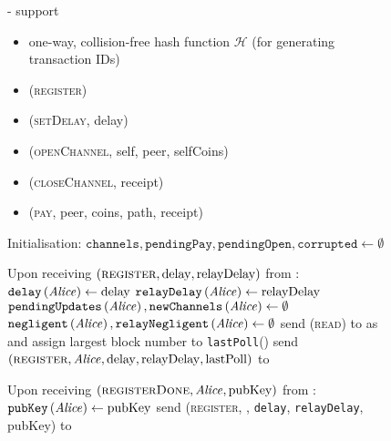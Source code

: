 \begin{figure}[H]
  \begin{systembox}{\fpaynet - support}
      \begin{itemize}
        \item one-way, collision-free hash function $\mathcal{H}$ (for
        generating transaction IDs)
      \end{itemize}

      \begin{itemize}
        \item (\textsc{register})
        \item (\textsc{setDelay}, delay)
        \item (\textsc{openChannel}, self, peer, selfCoins)
        \item (\textsc{closeChannel}, receipt)
        \item (\textsc{pay}, peer, coins, path, receipt)
      \end{itemize}

    \begin{algorithmic}[1]
      \State Initialisation:
      \Indent
        \State $\mathtt{channels}, \mathtt{pendingPay}, \mathtt{pendingOpen},
        \mathtt{corrupted} \gets \emptyset$
      \EndIndent
      \State

      \State Upon receiving $\left(\textsc{register}, \mathrm{delay},
      \mathrm{relayDelay}\right)$ from \alice:
      \Indent
        \State $\mathtt{delay}\left(\mathit{Alice}\right) \gets \mathrm{delay}$
        \State $\mathtt{relayDelay}\left(\mathit{Alice}\right) \gets
        \mathrm{relayDelay}$
        \State $\mathtt{pendingUpdates}\left(\mathit{Alice}\right),
        \mathtt{newChannels}\left(\mathit{Alice}\right) \gets \emptyset$
        \State $\mathtt{negligent}\left(\mathit{Alice}\right),
        \mathtt{relayNegligent}\left(\mathit{Alice}\right) \gets \emptyset$
        \State send (\textsc{read}) to \ledger{} as \alice{} and assign largest
        block number to \texttt{lastPoll}(\alice)
        \label{alg:fpaynet:support:lastpoll}
        \State send $\left(\textsc{register}, \mathit{Alice}, \mathrm{delay},
        \mathrm{relayDelay}, \mathrm{lastPoll}\right)$ to \simulator
      \EndIndent
      \State

      \State Upon receiving $\left(\textsc{registerDone}, \mathit{Alice},
      \mathrm{pubKey}\right)$ from \simulator:
      \Indent
        \State $\mathtt{pubKey}\left(\mathit{Alice}\right) \gets \mathrm{pubKey}$
        \State send (\textsc{register}, \alice, \texttt{delay},
        \texttt{relayDelay}, pubKey) to \alice
      \EndIndent
      \State


\end{algorithmic}
\end{systembox}
\end{figure}

